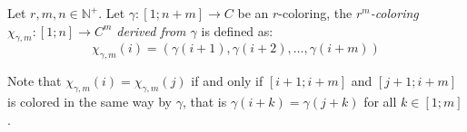 %
%

\begin{definition}
	Let $r,m,n \in \mathbb{N}^{+}$. Let $\gamma: [1; n + m] \to C$ be an $r$-coloring, the \textit{$r^m$-coloring $\chi_{\gamma, m}: [1; n] \to C^{m}$ derived from $\gamma$} is defined as:
	\begin{equation*}
		\chi_{\gamma, m}(i) = (\gamma(i + 1), \gamma(i + 2), \ldots, \gamma(i + m))
	\end{equation*}
\end{definition}
Note that $\chi_{\gamma, m}(i) = \chi_{\gamma, m}(j)$ if and only if $[i + 1; i + m]$ and $[j + 1; i + m]$ is colored in the same way by $\gamma$, that is $\gamma(i + k) = \gamma(j + k)$ for all $k \in [1; m]$.

